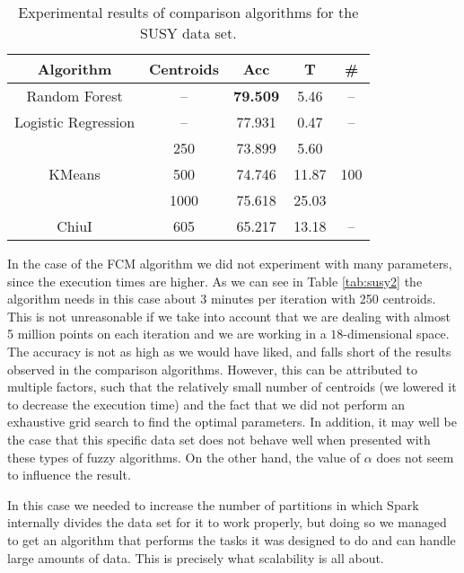 \begin{table}[h!]
\centering
\caption{Experimental results of comparison algorithms for the SUSY data set.}
\label{tab:susy1}
\begin{tabular}{ccccc}
\toprule
Algorithm & Centroids & Acc & T & \#\\ \midrule
Random Forest                      & --                   & \textbf{79.509}                    & 5.46       & --\\
Logistic Regression                    & --                   & 77.931                   & 0.47       & --                    \\
\multirow{3}{*}{KMeans} & 250                  & 73.899   & 5.60      & \multirow{3}{*}{100} \\
                        & 500                  & 74.746        & 11.87       &                      \\
                        & 1000                  & 75.618                      & 25.03      &                      \\
ChiuI                   & 605                 & 65.217                       & 13.18       & --                    \\ \bottomrule
\end{tabular}
\end{table}

In the case of the FCM algorithm we did not experiment with many parameters, since the execution times are higher. As we can see in Table \ref{tab:susy2} the algorithm needs in this case about 3 minutes per iteration with 250 centroids. This is not unreasonable if we take into account that we are dealing with almost 5 million points on each iteration and we are working in a $18$-dimensional space. The accuracy is not as high as we would have liked, and falls short of the results observed in the comparison algorithms. However, this can be attributed to multiple factors, such that the relatively small number of centroids (we lowered it to decrease the execution time) and the fact that we did not perform an exhaustive grid search to find the optimal parameters. In addition, it may well be the case that this specific data set does not behave well when presented with these types of fuzzy algorithms. On the other hand, the value of $\alpha$ does not seem to influence the result.

In this case we needed to increase the number of partitions in which Spark internally divides the data set for it to work properly, but doing so we managed to get an algorithm that performs the tasks it was designed to do and can handle large amounts of data. This is precisely what scalability is all about.

